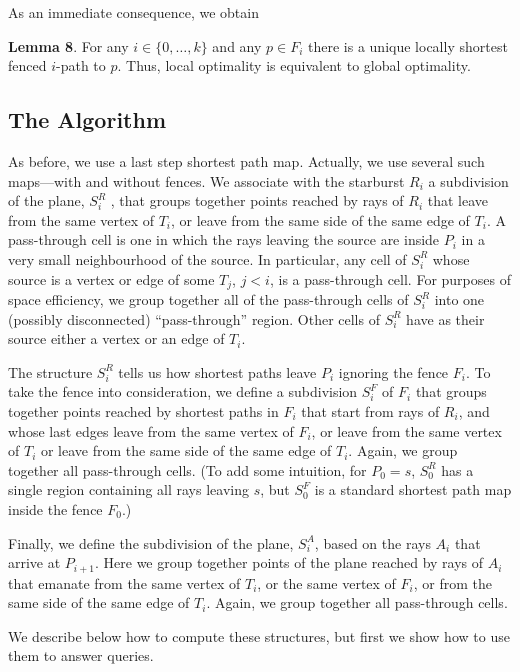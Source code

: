 \documentclass[a4paper]{article}
\begin{document}
As an immediate consequence, we obtain

\textbf{Lemma 8}. For any \(i \in \{0, \dots, k\}\) and any \(p \in F_i\) there is a unique locally shortest fenced \(i\)-path to \(p\). Thus, local optimality is equivalent to global optimality.

\subsection{The Algorithm}

As before, we use a last step shortest path map. Actually, we use several such maps—with and without fences. We associate with the starburst \(R_i\) a subdivision of the plane, \(S^R_i\) , that groups together points reached by rays of \(R_i\) that leave from the same vertex of \(T_i\), or leave from the same side of the same edge of \(T_i\). A pass-through cell is one in which the rays leaving the source are inside \(P_i\) in a very small neighbourhood of the source. In particular, any cell of \(S^R_i\) whose source is a vertex or edge of some \(T_j\), \(j < i\), is a pass-through cell. For purposes of space eﬃciency, we group together all of the pass-through cells of \(S^R_i\) into one (possibly disconnected) “pass-through” region. Other cells of \(S^R_i\) have as their source either a vertex or an edge of \(T_i\).

The structure \(S^R_i\) tells us how shortest paths leave \(P_i\) ignoring the fence \(F_i\). To take the fence into consideration, we define a subdivision  \(S^F_i\) of \(F_i\) that groups together points reached by shortest paths in \(F_i\) that start from rays of \(R_i\), and whose last edges leave from the same vertex of \(F_i\), or leave from the same vertex of \(T_i\) or leave from the same side of the same edge of \(T_i\). Again, we group together all pass-through cells. (To add some intuition, for \(P_0 = s\), \(S^R_0\) has a single region containing all rays leaving \(s\), but \(S^F_0\) is a standard shortest path map inside the fence \(F_0\).)

Finally, we define the subdivision of the plane, \(S^A_i\), based on the rays \(A_i\) that arrive at \(P_{i + 1}\). Here we group together points of the plane reached by rays of \(A_i\) that emanate from the same vertex of \(T_i\), or the same vertex of \(F_i\), or from the same side of the same edge of \(T_i\). Again, we group together all pass-through cells.

We describe below how to compute these structures, but first we show how to use them to answer queries. 
\end{document}
